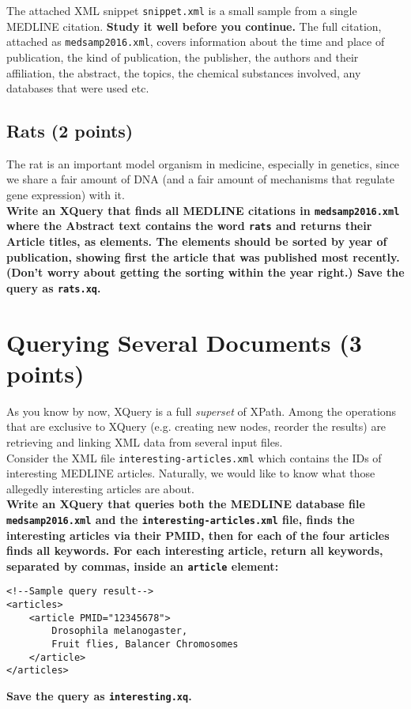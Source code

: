 \documentclass[a4paper, 12pt]{scrartcl}
\begin{document}
\noindent The attached XML snippet \texttt{snippet.xml} is a small sample from a single MEDLINE citation. \textbf{Study it well before you continue.} The full citation, attached as \texttt{medsamp2016.xml}, covers information about the time and place of publication, the kind of publication, the publisher, the authors and their affiliation, the abstract, the topics, the chemical substances involved, any databases that were used etc.

\subsection{Rats (2 points)}

The rat is an important model organism in medicine, especially in genetics, since we share a fair amount of DNA (and a fair amount of mechanisms that regulate gene expression) with it. \\

\noindent \textbf{Write an XQuery that finds all MEDLINE citations in \texttt{medsamp2016.xml} where the Abstract text contains the word \texttt{rats} and returns their Article titles, as elements. The elements should be sorted by year of publication, showing first the article that was published most recently. (Don't worry about getting the sorting within the year right.) Save the query as \texttt{rats.xq}.}

\section{Querying Several Documents (3 points)}

As you know by now, XQuery is a full \textit{superset} of XPath. Among the operations that are exclusive to XQuery (e.g. creating new nodes, reorder the results) are retrieving and linking XML data from several input files.    \\

\noindent Consider the  XML file \texttt{interesting-articles.xml} which contains the IDs of interesting MEDLINE articles. Naturally, we would like to know what those allegedly interesting articles are about. \\

\noindent \textbf{Write an XQuery that queries both the MEDLINE database file \texttt{medsamp2016.xml} and the \texttt{interesting-articles.xml} file, finds the interesting articles via their PMID, then for each of the four articles finds all keywords. For each interesting article, return all keywords, separated by commas, inside an \texttt{article} element:} \\

\lstset{language=XML}
\begin{lstlisting}
<!--Sample query result-->
<articles>
    <article PMID="12345678">
        Drosophila melanogaster, 
        Fruit flies, Balancer Chromosomes
    </article>
</articles>
\end{lstlisting}

\noindent \textbf{Save the query as \texttt{interesting.xq}.}
\end{document}
